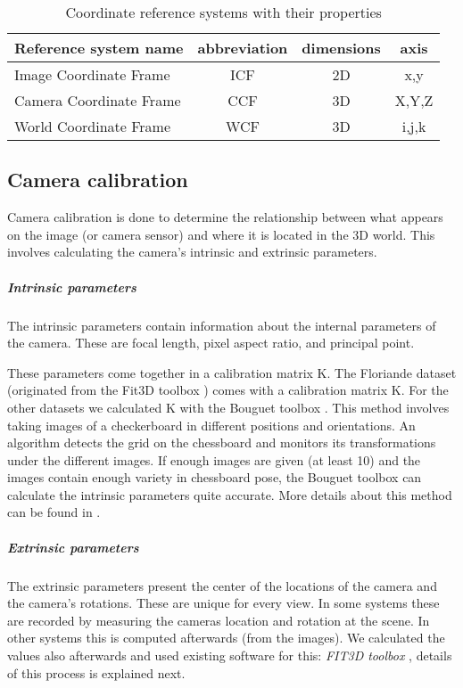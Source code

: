 \begin{table}[ht]
	\caption{Coordinate reference systems with their properties}
	\label{tab:coord}
	\begin{tabular}{|l||c|c|c|}
	\hline
	Reference system name		&	abbreviation	&	dimensions	&	axis\\
	\hline
	\hline
	Image Coordinate Frame	&   ICF			&	2D			& 	x,y\\
	\hline
	Camera Coordinate Frame	&   CCF			&	3D			& 	X,Y,Z\\
	\hline
	World Coordinate Frame	&   WCF			&	3D			& 	i,j,k\\
	\hline
	\end{tabular}
\end{table}

\subsection{Camera calibration}
\label{sec:cameraCalibration}
Camera calibration is done to determine
the relationship between what appears on the image (or camera sensor) and where
 it is located in the 3D world. This involves calculating the camera's intrinsic
 and extrinsic parameters.

\subparagraph{Intrinsic parameters}
The intrinsic parameters contain information about the internal parameters
of the camera.  These are focal length, pixel aspect ratio, and principal point.

These parameters come together in a calibration matrix K.  The Floriande
dataset (originated from the Fit3D toolbox \cite{FIT3D}) comes with a
calibration matrix K.  For
the other datasets we calculated K with the Bouguet toolbox
\cite{bouguet}.
This method involves taking images of a checkerboard in different positions and
orientations. An algorithm detects the grid on the chessboard and monitors its
transformations under the different images.  If enough images are given (at
least 10) and the images contain enough variety in chessboard pose, the Bouguet
toolbox can calculate the intrinsic parameters quite accurate.
More details about this method can be found in \cite{bouguet}.

\subparagraph{Extrinsic parameters}
The extrinsic parameters present the center of the locations of the camera
and the camera's rotations. These are unique for every view.
In some systems these are recorded by measuring the cameras location and
rotation at the scene. In other systems this is computed afterwards (from the
images).  We calculated the values also afterwards and used existing software for
this: \emph{FIT3D toolbox} \cite{FIT3D}, details of this process is
explained next.


